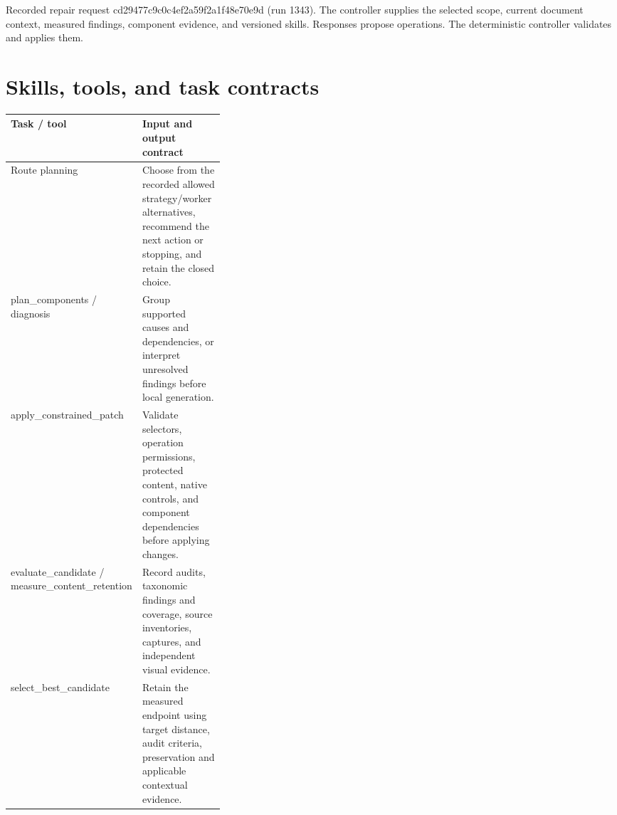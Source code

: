 \documentclass[acmsmall,screen,nonacm]{acmart}
\begin{document}
Recorded repair request cd29477c9c0c4ef2a59f2a1f48e70e9d (run 1343). The controller supplies the selected scope, current document context, measured findings, component evidence, and versioned skills. Responses propose operations. The deterministic controller validates and applies them.

\clearpage
\section{Skills, tools, and task contracts}

\begingroup\footnotesize\setlength{\tabcolsep}{3pt}\renewcommand{\arraystretch}{1.14}
\noindent\begin{tabular*}{\linewidth}{@{\extracolsep{\fill}}p{0.3500\linewidth}p{}@{}}\toprule
\raggedright\textbf{Task / tool} & \raggedright\textbf{Input and output contract}\tabularnewline\midrule
\raggedright Route planning & \raggedright Choose from the recorded allowed strategy/worker alternatives, recommend the next action or stopping, and retain the closed choice.\tabularnewline
\raggedright plan\_components / diagnosis & \raggedright Group supported causes and dependencies, or interpret unresolved findings before local generation.\tabularnewline
\raggedright apply\_constrained\_patch & \raggedright Validate selectors, operation permissions, protected content, native controls, and component dependencies before applying changes.\tabularnewline
\raggedright evaluate\_candidate / measure\_content\_retention & \raggedright Record audits, taxonomic findings and coverage, source inventories, captures, and independent visual evidence.\tabularnewline
\raggedright select\_best\_candidate & \raggedright Retain the measured endpoint using target distance, audit criteria, preservation and applicable contextual evidence.\tabularnewline
\bottomrule\end{tabular*}\endgroup\par\medskip
\end{document}
